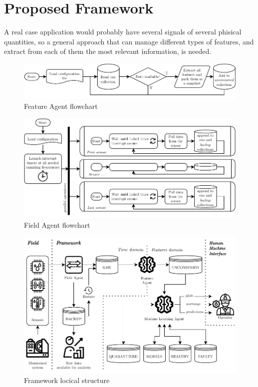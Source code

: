 \chapter{Proposed Framework}
\label{ch:Framework}

A real case application would probably have several signals of several phisical quantities, so a general approach that can manage different types of features, and extract from each of them the most relevant information, is needed.

\begin{figure}
    \centering
    \includegraphics[width=\textwidth]{images/Framework/FA_flowchart.pdf}
    \caption{Feature Agent flowchart}
    \label{fig:FA_flowchart}
\end{figure}

\begin{figure}
    \centering
    \includegraphics[scale=1]{images/Framework/Field_Agent_flowchart.pdf}
    \caption{Field Agent flowchart}
    \label{fig:Field_Agent_flowchart}
\end{figure}

\begin{figure}
    \centering
    \includegraphics[width=\textwidth]{images/Framework/Framework_structure.pdf}
    \caption{Framework locical structure}
    \label{fig:Framework_structure}
\end{figure}

